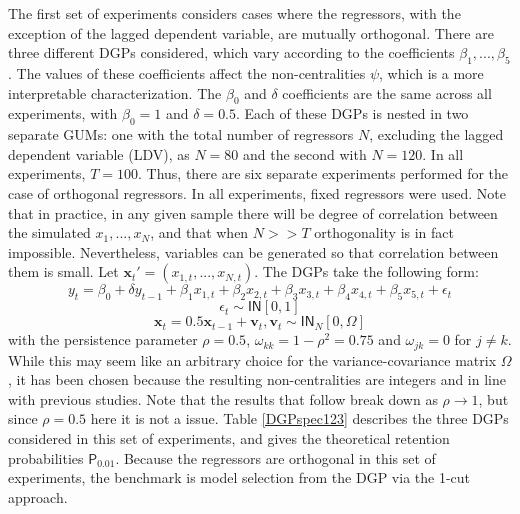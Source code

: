 The first set of experiments considers cases where the regressors, with the exception of the lagged dependent variable, are mutually orthogonal. There are three different DGPs considered, which vary according to the coefficients $\beta_{1},...,\beta_{5}$. The values of these coefficients affect the non-centralities $\psi$, which is a more interpretable characterization. The $\beta_{0}$ and $\delta$ coefficients are the same across all experiments, with $\beta_{0}=1$ and $\delta= 0.5$.  Each of these DGPs is nested in two separate GUMs: one with the total number of regressors $N$, excluding the lagged dependent variable (LDV),  as $N=80$ and the second with $N=120$. In all experiments, $T=100$. Thus, there are six separate experiments performed for the case of orthogonal regressors. In all experiments, fixed regressors were used. Note that in practice, in any given sample there will be degree of correlation between the simulated $x_{1},...,x_{N}$, and that when  $N>>T$ orthogonality is in fact impossible. Nevertheless, variables can be generated so that correlation between them is small. Let $\textbf{x}_{t}'=(x_{1,t},...,x_{N,t})$. The DGPs take the following form: 
$$y_{t}=\beta_{0} + \delta y_{t-1}+\beta_{1}x_{1,t}+\beta_{2}x_{2,t}+ \beta_{3}x_{3,t}+ \beta_{4}x_{4,t}+ \beta_{5}x_{5,t} + \epsilon_{t}$$
$$\epsilon_{t} \sim \mathsf{IN}[0,1] $$
$$\textbf{x}_{t}=0.5\textbf{x}_{t-1}+\textbf{v}_{t}, \textbf{v}_{t} \sim \mathsf{IN}_{N}[0,\Omega]$$
with the persistence parameter $\rho = 0.5$, $\omega_{kk} = 1-\rho^{2} = 0.75$ and $\omega_{jk} = 0 $ for $j \neq k$. While this may seem like an arbitrary choice for the variance-covariance matrix $\Omega$, it has been chosen because the resulting non-centralities are integers and in line with previous studies. Note that the results that follow break down as $\rho\rightarrow 1$, but since $\rho=0.5$ here it is not a issue. Table \ref{DGPspec123} describes the three DGPs considered in this set of experiments, and gives the theoretical retention probabilities $ \mathsf{P}_{0.01}$. Because the regressors are orthogonal in this set of experiments, the benchmark is model selection from the DGP via the 1-cut approach.  

